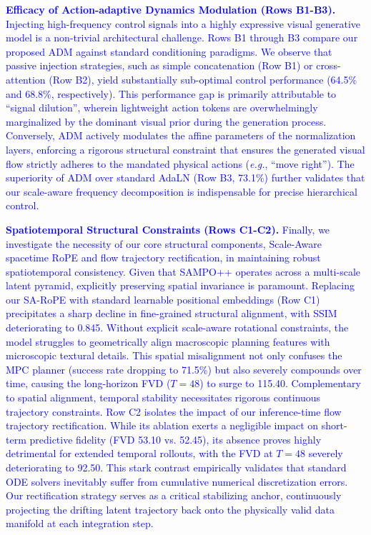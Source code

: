 \textcolor{blue}{\textbf{Efficacy of Action-adaptive Dynamics Modulation (Rows B1-B3).} Injecting high-frequency control signals into a highly expressive visual generative model is a non-trivial architectural challenge. Rows B1 through B3 compare our proposed ADM against standard conditioning paradigms. We observe that passive injection strategies, such as simple concatenation (Row B1) or cross-attention (Row B2), yield substantially sub-optimal control performance (64.5\% and 68.8\%, respectively). This performance gap is primarily attributable to ``signal dilution'', wherein lightweight action tokens are overwhelmingly marginalized by the dominant visual prior during the generation process. Conversely, ADM actively modulates the affine parameters of the normalization layers, enforcing a rigorous structural constraint that ensures the generated visual flow strictly adheres to the mandated physical actions (\textit{e.g.}, ``move right''). The superiority of ADM over standard AdaLN (Row B3, 73.1\%) further validates that our scale-aware frequency decomposition is indispensable for precise hierarchical control.}

\textcolor{blue}{\textbf{Spatiotemporal Structural Constraints (Rows C1-C2).} Finally, we investigate the necessity of our core structural components, Scale-Aware spacetime RoPE and flow trajectory rectification, in maintaining robust spatiotemporal consistency. Given that SAMPO++ operates across a multi-scale latent pyramid, explicitly preserving spatial invariance is paramount. Replacing our SA-RoPE with standard learnable positional embeddings (Row C1) precipitates a sharp decline in fine-grained structural alignment, with SSIM deteriorating to 0.845. Without explicit scale-aware rotational constraints, the model struggles to geometrically align macroscopic planning features with microscopic textural details. This spatial misalignment not only confuses the MPC planner (success rate dropping to 71.5\%) but also severely compounds over time, causing the long-horizon FVD ($T=48$) to surge to 115.40. Complementary to spatial alignment, temporal stability necessitates rigorous continuous trajectory constraints. Row C2 isolates the impact of our inference-time flow trajectory rectification. While its ablation exerts a negligible impact on short-term predictive fidelity (FVD 53.10 vs. 52.45), its absence proves highly detrimental for extended temporal rollouts, with the FVD at $T=48$ severely deteriorating to 92.50.  This stark contrast empirically validates that standard ODE solvers inevitably suffer from cumulative numerical discretization errors. Our rectification strategy serves as a critical stabilizing anchor, continuously projecting the drifting latent trajectory back onto the physically valid data manifold at each integration step.}


